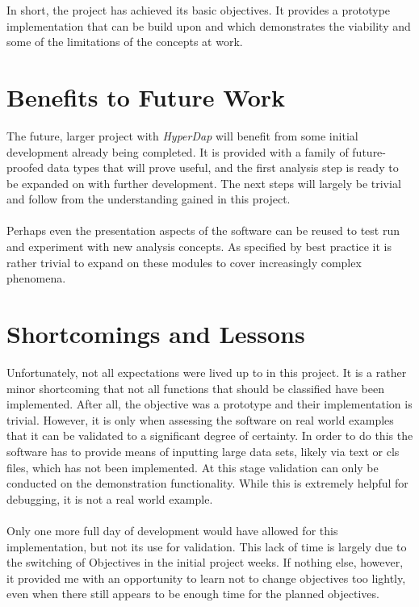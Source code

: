 \documentclass[main.tex]{subfiles}
\begin{document}
  
  In short, the project has achieved its basic objectives. It provides a prototype implementation that can be build upon and which demonstrates the viability and some of the limitations of the concepts at work.  
  
  \section{Benefits to Future Work}
    
    The future, larger project with \textit{HyperDap} will benefit from some initial development already being completed. It is provided with a family of future-proofed data types that will prove useful, and the first analysis step is ready to be expanded on with further development. The next steps will largely be trivial and follow from the understanding gained in this project. 
    \\\\
    Perhaps even the presentation aspects of the software can be reused to test run and experiment with new analysis concepts. As specified by best practice it is rather trivial to expand on these modules to cover increasingly complex phenomena. 
    
  \section{Shortcomings and Lessons}
    
    Unfortunately, not all expectations were lived up to in this project. It is a rather minor shortcoming that not all functions that should be classified have been implemented. After all, the objective was a prototype and their implementation is trivial. However, it is only when assessing the software on real world examples that it can be validated to a significant degree of certainty. In order to do this the software has to provide means of inputting large data sets, likely via text or cls files, which has not been implemented. At this stage validation can only be conducted on the demonstration functionality. While this is extremely helpful for debugging, it is not a real world example. 
    \\\\
    Only one more full day of development would have allowed for this implementation, but not its use for validation. This lack of time is largely due to the switching of Objectives in the initial project weeks. If nothing else, however, it provided me with an opportunity to learn not to change objectives too lightly, even when there still appears to be enough time for the planned objectives.
    
\end{document}

